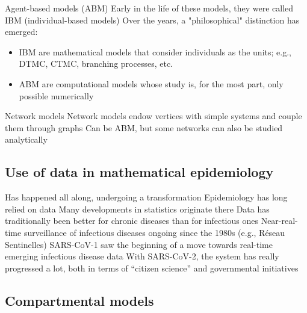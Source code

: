 \documentclass[aspectratio=169]{beamer}\usepackage[]{graphicx}\usepackage[]{xcolor}
\begin{document}
\begin{frame}{Agent-based models (ABM)}
\bbullet Early in the life of these models, they were called IBM (individual-based models)
\vfill
\bbullet Over the years, a "philosophical" distinction has emerged:
\begin{itemize}
\item IBM are mathematical models that consider individuals as the units; e.g., DTMC, CTMC, branching processes, etc.
\item ABM are computational models whose study is, for the most part, only possible numerically
\end{itemize}
\end{frame}

\begin{frame}{Network models}
\bbullet Network models endow vertices with simple systems and couple them through graphs
\vfill
\bbullet Can be ABM, but some networks can also be studied analytically
\end{frame}

\subsection{Use of data in mathematical epidemiology}


\begin{frame}{Has happened all along, undergoing a transformation}
\bbullet Epidemiology has long relied on data
\vfill
\bbullet Many developments in statistics originate there
\vfill
\bbullet Data has traditionally been better for chronic diseases than for infectious ones
\vfill
\bbullet Near-real-time surveillance of infectious diseases ongoing since the 1980s (e.g., Réseau Sentinelles)
\vfill
\bbullet SARS-CoV-1 saw the beginning of a move towards real-time emerging infectious disease data
\vfill
\bbullet With SARS-CoV-2, the system has really progressed a lot, both in terms of ``citizen science'' and governmental initiatives
\end{frame}



\subsection{Compartmental models}
\end{document}
